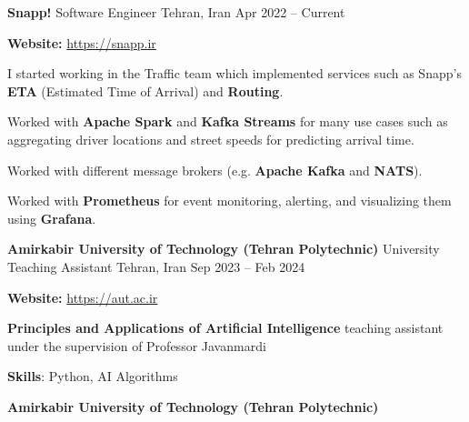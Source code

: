 \documentclass[]{awesome-cv}
\begin{document}
\begin{cventries}
	\cventry
	{\textbf{Snapp!}}
	{Software Engineer}
	{Tehran, Iran}
	{Apr 2022 – Current}
	{\begin{cvitems}
        \vspace{1mm}
        \item[] {\hspace{-9mm}\textbf{Website:} \href{https://snapp.ir}{\textcolor{awesome}{https://snapp.ir}}}
		\vspace{1mm}
		\item I started working in the Traffic team which implemented services such as Snapp’s \textbf{ETA} (Estimated Time of Arrival) and \textbf{Routing}. 
        \vspace{1mm}
        \item Worked with \textbf{Apache Spark} and \textbf{Kafka Streams} for many use cases such as aggregating driver locations and street speeds for predicting arrival time. 
        \vspace{1mm}
        \item Worked with different message brokers (e.g. \textbf{Apache Kafka} and \textbf{NATS}).
        \vspace{1mm}
        \item Worked with \textbf{Prometheus} for event monitoring, alerting, and visualizing them using \textbf{Grafana}.
		\vspace{1mm}
	\end{cvitems}}
    \cventry
    {\textbf{Amirkabir University of Technology (Tehran Polytechnic)}}
	{University Teaching Assistant}
	{Tehran, Iran}
	{Sep 2023 – Feb 2024}
	{\begin{cvitems}
        \vspace{1mm}
        \item[] {\hspace{-9mm}\textbf{Website:} \href{https://aut.ac.ir}{\textcolor{awesome}{https://aut.ac.ir}}}
		\vspace{1mm}
		\item[] {\hspace{-9mm}}\textbf{Principles and Applications of Artificial Intelligence} teaching assistant under the supervision of Professor Javanmardi
		\vspace{1mm}
        \item {\textbf{Skills}: Python, AI Algorithms}
        \vspace{1mm}
	\end{cvitems}}
    \cventry
    {\textbf{Amirkabir University of Technology (Tehran Polytechnic)}}

\end{cventries}
\end{document}
